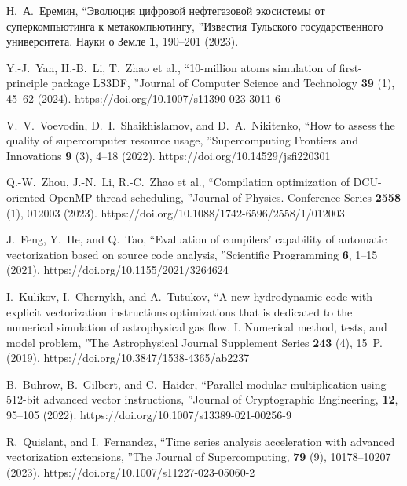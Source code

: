 \documentclass[
11pt,%
tightenlines,%
twoside,%
onecolumn,%
nofloats,%
nobibnotes,%
nofootinbib,%
superscriptaddress,%
noshowpacs,%
centertags]%
{revtex4}
\begin{document}
\begin{thebibliography}{99}
Н.~А.~Еремин, \textquotedblleft Эволюция цифровой нефтегазовой экосистемы от суперкомпьютинга к метакомпьютингу, \textquotedblright Известия Тульского государственного университета. Науки о Земле \textbf{1}, 190--201 (2023).

Y.-J.~Yan, H.-B.~Li, T.~Zhao et al., \textquotedblleft 10-million atoms simulation of first-principle package LS3DF, \textquotedblright Journal of Computer Science and Technology \textbf{39} (1), 45--62 (2024). https://doi.org/10.1007/s11390-023-3011-6

V.~V.~Voevodin, D.~I.~Shaikhislamov, and D.~A.~Nikitenko, \textquotedblleft How to assess the quality of supercomputer resource usage, \textquotedblright Supercomputing Frontiers and Innovations \textbf{9} (3), 4--18 (2022). https://doi.org/10.14529/jsfi220301

Q.-W.~Zhou, J.-N.~Li, R.-C.~Zhao et al., \textquotedblleft Compilation optimization of DCU-oriented OpenMP thread scheduling, \textquotedblright Journal of Physics. Conference Series \textbf{2558} (1), 012003 (2023). https://doi.org/10.1088/1742-6596/2558/1/012003

J.~Feng, Y.~He, and Q.~Tao, \textquotedblleft Evaluation of compilers’ capability of automatic vectorization based on source code analysis, \textquotedblright Scientific Programming \textbf{6}, 1--15 (2021). https://doi.org/10.1155/2021/3264624


I.~Kulikov, I.~Chernykh, and A.~Tutukov, \textquotedblleft A new hydrodynamic code with explicit vectorization instructions optimizations that is dedicated to the numerical simulation of astrophysical gas flow. I. Numerical method, tests, and model problem, \textquotedblright The Astrophysical Journal Supplement Series \textbf{243} (4), 15~P. (2019). https://doi.org/10.3847/1538-4365/ab2237

B.~Buhrow, B.~Gilbert, and C.~Haider, \textquotedblleft Parallel modular multiplication using 512-bit advanced vector instructions, \textquotedblright Journal of Cryptographic Engineering, \textbf{12}, 95--105 (2022). https://doi.org/10.1007/s13389-021-00256-9

R.~Quislant, and I.~Fernandez, \textquotedblleft Time series analysis acceleration with advanced vectorization extensions, \textquotedblright The Journal of Supercomputing, \textbf{79} (9), 10178--10207 (2023). https://doi.org/10.1007/s11227-023-05060-2


\end{thebibliography}
\end{document}
